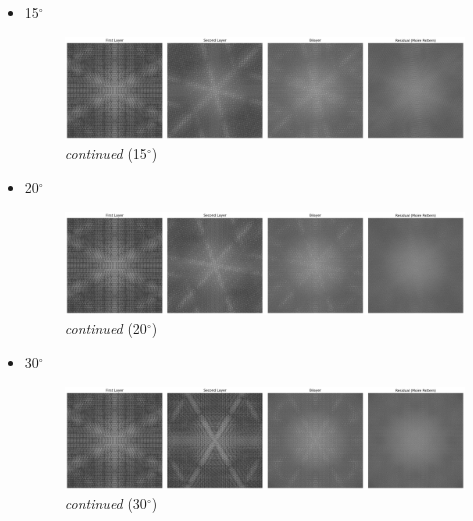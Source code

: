 \documentclass[12pt,a4paper]{article}
\begin{document}
\begin{CJK}{UTF8}{bkai}
\begin{itemize}
    \item 15$^\circ$
    \begin{figure}[h]
        \centering
        \includegraphics[width=0.95\linewidth]{figures/15degree_fft.png}
        \caption{\textit{continued} (15$^\circ$)}
        \label{fig:moire_15_fft}
    \end{figure}
    \clearpage
    \item 20$^\circ$
    \begin{figure}[h]
        \centering
        \includegraphics[width=0.95\linewidth]{figures/20degree_fft.png}
        \caption{\textit{continued} (20$^\circ$)}
        \label{fig:moire_20_fft}
    \end{figure}
    \item 30$^\circ$
    \begin{figure}[h]
        \centering
        \includegraphics[width=0.95\linewidth]{figures/30degree_fft.png}
        \caption{\textit{continued} (30$^\circ$)}
        \label{fig:moire_30_fft}
    \end{figure}
    


\end{itemize}
\end{CJK}
\end{document}
